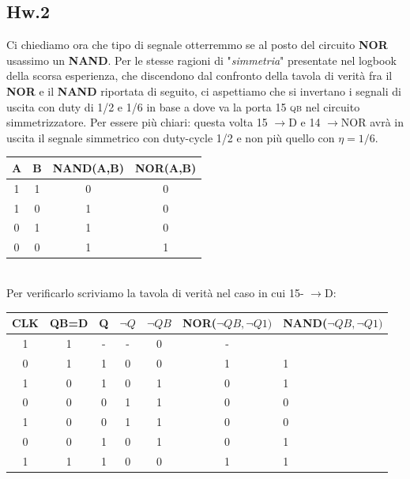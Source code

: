 \documentclass[journal, a4paper]{IEEEtran}
\begin{document}
\subsection{Hw.2}
Ci chiediamo ora che tipo di segnale otterremmo se al posto del circuito \textbf{NOR} usassimo un \textbf{NAND}. Per le stesse ragioni di "\textit{simmetria}" presentate nel logbook della scorsa esperienza, che discendono dal confronto della tavola di verità fra il \textbf{NOR} e il \textbf{NAND} riportata di seguito, ci aspettiamo che si invertano i segnali di uscita con duty di 1/2 e 1/6 in base a dove va la porta 15 \textsc{qb} nel circuito simmetrizzatore. Per essere più chiari: questa volta 15 $\rightarrow$D e 14 $\rightarrow$NOR avrà in uscita il segnale simmetrico con duty-cycle 1/2 e non più quello con $\eta = 1/6$.\\


\begin{table}[h]
\centering
\begin{tabular}{c|c||c|c}
\hline \textbf{A} & \textbf{B} & \textbf{NAND(A,B)} & \textbf{NOR(A,B)} \\ 
\hline 1 & 1 & 0 & 0 \\ 
 1 & 0 & 1 & 0 \\ 
 0 & 1 & 1 & 0 \\ 
 0 & 0 & 1 & 1 \\ 
\hline
\end{tabular} 
\end{table}
~\\

Per verificarlo scriviamo la tavola di verità nel caso in cui 15- $\rightarrow$D:

\begin{table}[h] %
\centering
\begin{tabular}{c|c|c|c|c|cl}
\hline \textbf{CLK} & \textbf{QB=D} & \textbf{Q} & \textbf{$\lnot Q$} & \textbf{$\lnot QB$} & \textbf{NOR($\lnot QB, \lnot Q1)$} & \textbf{NAND($\lnot QB, \lnot Q1)$}\\ 
\hline
 1 & 1 &   -&  -& 0 & -& \\ 
 0 & 1 &   1&  0& 0 & 1& 1\\
 1 & 0 &   1&  0& 1 & 0& 1\\ 
 0 & 0 &   0&  1& 1 & 0& 0\\ 
 1 & 0 &   0&  1& 1 & 0& 0\\
 0 & 0 &   1&  0& 1 & 0& 1\\
 1 & 1 &   1&  0& 0 & 1& 1\\
\end{tabular} 
\end{table}
~\\
\end{document}
